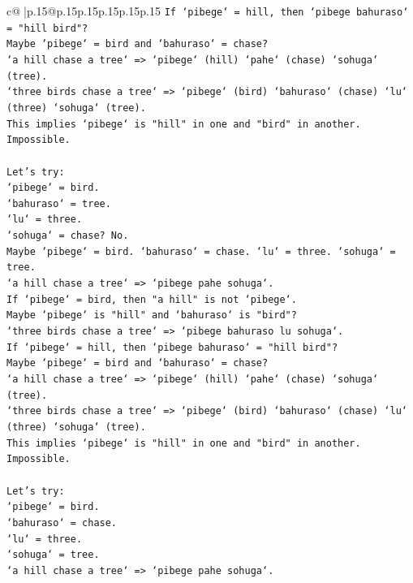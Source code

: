 \documentclass{article}
\begin{document}
{\begin{supertabular}{c@{$\;$}|p{.15\linewidth}@{}p{.15\linewidth}p{.15\linewidth}p{.15\linewidth}p{.15\linewidth}p{.15\linewidth}}
{{{\texttt{If `pibege` = hill, then `pibege bahuraso` = "hill bird"?} \\
\texttt{Maybe `pibege` = bird and `bahuraso` = chase?} \\
\texttt{`a hill chase a tree` => `pibege` (hill) `pahe` (chase) `sohuga` (tree).} \\
\texttt{`three birds chase a tree` => `pibege` (bird) `bahuraso` (chase) `lu` (three) `sohuga` (tree).} \\
\texttt{This implies `pibege` is "hill" in one and "bird" in another. Impossible.} \\
\\ 
\texttt{Let's try:} \\
\texttt{`pibege` = bird.} \\
\texttt{`bahuraso` = tree.} \\
\texttt{`lu` = three.} \\
\texttt{`sohuga` = chase? No.} \\
\texttt{Maybe `pibege` = bird. `bahuraso` = chase. `lu` = three. `sohuga` = tree.} \\
\texttt{`a hill chase a tree` => `pibege pahe sohuga`.} \\
\texttt{If `pibege` = bird, then "a hill" is not `pibege`.} \\
\texttt{Maybe `pibege` is "hill" and `bahuraso` is "bird"?} \\
\texttt{`three birds chase a tree` => `pibege bahuraso lu sohuga`.} \\
\texttt{If `pibege` = hill, then `pibege bahuraso` = "hill bird"?} \\
\texttt{Maybe `pibege` = bird and `bahuraso` = chase?} \\
\texttt{`a hill chase a tree` => `pibege` (hill) `pahe` (chase) `sohuga` (tree).} \\
\texttt{`three birds chase a tree` => `pibege` (bird) `bahuraso` (chase) `lu` (three) `sohuga` (tree).} \\
\texttt{This implies `pibege` is "hill" in one and "bird" in another. Impossible.} \\
\\ 
\texttt{Let's try:} \\
\texttt{`pibege` = bird.} \\
\texttt{`bahuraso` = chase.} \\
\texttt{`lu` = three.} \\
\texttt{`sohuga` = tree.} \\
\texttt{`a hill chase a tree` => `pibege pahe sohuga`.} \\
}}}
\end{supertabular}}
\end{document}
